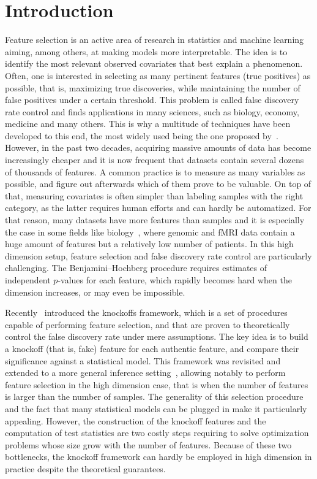\cleardoublepage
\chapter*{Introduction}

Feature selection is an active area of research in statistics and machine learning
aiming, among others, at making models more interpretable.
The idea is to identify the most relevant observed covariates that best explain a phenomenon.
Often, one is interested in selecting as many pertinent features (true positives) as possible,
that is, maximizing true discoveries,
while maintaining the number of false positives under a certain threshold.
This problem is called false discovery rate control and finds applications in many sciences,
such as biology, economy, medicine and many others.
This is why a multitude of techniques have been developed to this end,
the most widely used being the one proposed by~\cite{bh}.
However, in the past two decades, acquiring massive amounts of data has become increasingly cheaper
and it is now frequent that datasets contain several dozens of thousands of features.
A common practice is to measure as many variables as possible,
and figure out afterwards which of them prove to be valuable.
On top of that, measuring covariates is often simpler than labeling samples with the right category,
as the latter requires human efforts and can hardly be automatized.
For that reason, many datasets have more features than samples
and it is especially the case in some fields like biology~\citep{statistical_inference_genome},
where genomic and fMRI data contain a huge amount of features but a relatively low number of patients.
In this high dimension setup, feature selection and false discovery rate control are particularly challenging.
The Benjamini–Hochberg procedure requires estimates of independent $p$-values for each feature,
which rapidly becomes hard when the dimension increases,
or may even be impossible.

Recently~\citet{fixed_x_knockoffs} introduced the knockoffs framework,
which is a set of procedures capable of performing feature selection,
and that are proven to theoretically control the false discovery rate under mere assumptions.
The key idea is to build a knockoff (that is, fake) feature for each authentic feature,
and compare their significance against a statistical model.
This framework was revisited and extended to a more general inference setting~\citep{model_x_knockoffs},
allowing notably to perform feature selection in the high dimension case,
that is when the number of features is larger than the number of samples.
The generality of this selection procedure
and the fact that many statistical models can be plugged in make it particularly appealing.
However, the construction of the knockoff features and the computation of test statistics
are two costly steps requiring to solve optimization problems whose size grow with the number of features.
Because of these two bottlenecks,
the knockoff framework can hardly be employed in high dimension in practice despite the theoretical guarantees.


